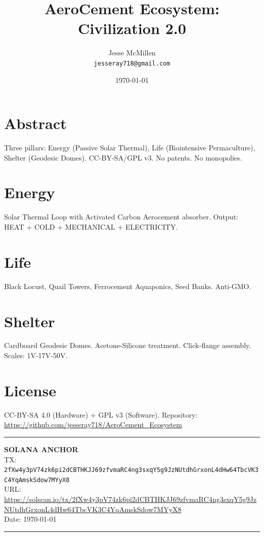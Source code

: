 \documentclass[12pt,a4paper]{article}
\title{\textbf{AeroCement Ecosystem: Civilization 2.0}}
\author{Jesse McMillen \\ \texttt{jesseray718@gmail.com}}
\date{\today}
\begin{document}
\maketitle

\section*{Abstract}
Three pillars: Energy (Passive Solar Thermal), Life (Biointensive Permaculture), Shelter (Geodesic Domes). CC-BY-SA/GPL v3. No patents. No monopolies.

\section{Energy}
Solar Thermal Loop with Activated Carbon Aerocement absorber. Output: HEAT + COLD + MECHANICAL + ELECTRICITY.

\section{Life}
Black Locust, Quail Towers, Ferrocement Aquaponics, Seed Banks. Anti-GMO.

\section{Shelter}
Cardboard Geodesic Domes. Acetone-Silicone treatment. Click-flange assembly. Scales: 1V-17V-50V.

\section{License}
CC-BY-SA 4.0 (Hardware) + GPL v3 (Software). Repository: \url{https://github.com/jesseray718/AeroCement_Ecosystem}

\vspace{1cm}
\hrule
\begin{center}
\textbf{SOLANA ANCHOR}\\
TX: \texttt{2fXw4y3pV74zk6pi2dCBTHKJJ69zfvmaRC4ng3sxqY5g9JzNUtdhGrxonL4dHw64TbcVK3C4YqAmskSdow7MYyX8}\\
URL: \url{https://solscan.io/tx/2fXw4y3pV74zk6pi2dCBTHKJJ69zfvmaRC4ng3sxqY5g9JzNUtdhGrxonL4dHw64TbcVK3C4YqAmskSdow7MYyX8}\\
Date: \today
\end{center}
\hrule
\end{document}
